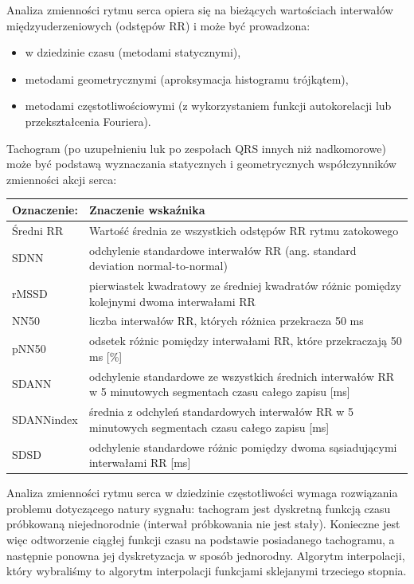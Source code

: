 \documentclass[a4paper, 11pt]{article}
\begin{document}
Analiza zmienności rytmu serca opiera się na bieżących wartościach interwałów międzyuderzeniowych (odstępów RR) i może być prowadzona:
\begin{itemize}
\item w dziedzinie czasu (metodami statycznymi),
\item metodami geometrycznymi (aproksymacja histogramu trójkątem),
\item metodami częstotliwościowymi (z wykorzystaniem funkcji autokorelacji lub przekształcenia Fouriera).
\end{itemize}

Tachogram (po uzupełnieniu luk po zespołach QRS innych niż nadkomorowe) może być podstawą wyznaczania statycznych i geometrycznych współczynników zmienności akcji serca:
\newline
\begin{tabular}{|l|l|}
\hline
Oznaczenie: & Znaczenie wskaźnika \\ \hline
Średni RR & Wartość średnia ze wszystkich odstępów RR rytmu zatokowego \\ \hline
SDNN & odchylenie standardowe interwałów RR (ang. standard deviation normal-to-normal) \\ \hline
rMSSD & pierwiastek kwadratowy ze średniej kwadratów różnic pomiędzy kolejnymi dwoma interwałami RR \\ \hline
NN50 & liczba interwałów RR, których różnica przekracza 50 ms \\ \hline
pNN50 & odsetek różnic pomiędzy interwałami RR, które przekraczają 50 ms [\%] \\ \hline
SDANN & odchylenie standardowe ze wszystkich średnich interwałów RR w 5 minutowych segmentach czasu całego zapisu [ms] \\ \hline
SDANNindex & średnia z odchyleń standardowych interwałów RR w 5 minutowych segmentach czasu całego zapisu [ms] \\ \hline
SDSD & odchylenie standardowe różnic pomiędzy dwoma sąsiadującymi interwałami RR [ms] \\
\hline
\end{tabular}
\linebreak

Analiza zmienności rytmu serca w dziedzinie częstotliwości wymaga rozwiązania problemu dotyczącego natury sygnału: tachogram jest dyskretną funkcją czasu próbkowaną niejednorodnie (interwał próbkowania nie jest stały). Konieczne jest więc odtworzenie ciągłej funkcji czasu na podstawie posiadanego tachogramu, a następnie ponowna jej dyskretyzacja w sposób jednorodny.
Algorytm interpolacji, który wybraliśmy to algorytm interpolacji funkcjami sklejanymi trzeciego stopnia.
\end{document}
